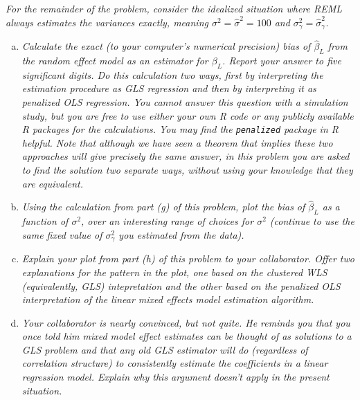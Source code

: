 \documentclass[11pt, letterpaper]{article}
\begin{document}
{\em For the remainder of the problem, consider the idealized situation where REML always estimates the variances
exactly, meaning $\sigma^2=\hat{\sigma}^2=100$ and $\sigma^2_\gamma=\hat{\sigma}^2_\gamma$.}
\begin{enumerate}[(a)]
\addtocounter{enumi}{6}
\item {\em Calculate the exact (to your computer's numerical precision) bias of $\hat{\beta}_L$ from the random effect model as an estimator for $\beta_L$.  Report your answer to five significant digits.  Do this calculation two ways, first by interpreting the estimation procedure as GLS regression and then by interpreting it as penalized OLS regression.   You cannot answer this question with a simulation study, but you are free to use either your own R code or any publicly available R packages for the calculations.  You may find the 
\texttt{penalized} package in R helpful.  Note that although we have seen a theorem that implies these two approaches will give precisely the same answer, in this
problem you are asked to find the solution two separate ways, without using your knowledge that they are equivalent.  }


\item  {\em Using the calculation from part (g) of this problem, plot the bias of $\hat{\beta}_L$ as
a function of $\sigma^2$, over an interesting range of choices for $\sigma^2$ (continue to use the same fixed value
of $\sigma^2_\gamma$ you estimated from the data).}
\item {\em Explain your plot from part (h) of this problem to your collaborator.  Offer two explanations for the pattern in the plot, one based on the clustered WLS (equivalently, GLS) intepretation and the other based on the penalized OLS interpretation of the linear mixed effects model estimation algorithm.}
\item {\em Your collaborator is nearly convinced, but not quite.  He reminds you that you
once told him mixed model effect estimates can be thought of as solutions to a GLS problem and that
any old GLS estimator will do (regardless of correlation structure) to consistently estimate the 
coefficients in a linear regression model.  Explain why this argument doesn't apply in the present situation.}
\end{enumerate}
\end{document}
